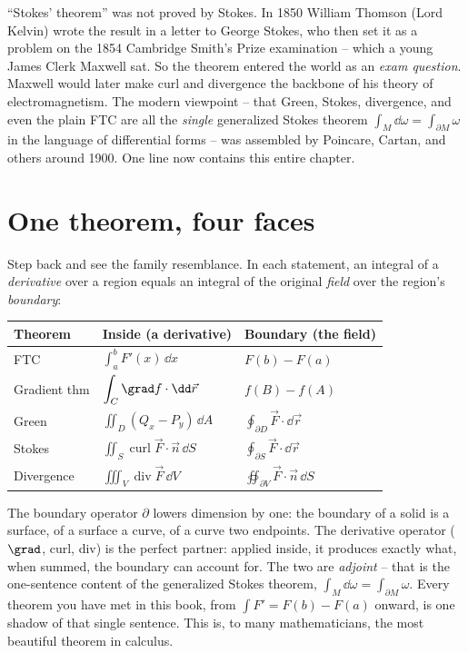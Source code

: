 \begin{historybox}
``Stokes' theorem'' was not proved by Stokes. In 1850 William Thomson (Lord Kelvin)
wrote the result in a letter to George Stokes, who then set it as a problem on the
1854 Cambridge Smith's Prize examination -- which a young James Clerk Maxwell sat.
So the theorem entered the world as an \emph{exam question}. Maxwell would later
make curl and divergence the backbone of his theory of electromagnetism. The modern
viewpoint -- that Green, Stokes, divergence, and even the plain FTC are all the
\emph{single} generalized Stokes theorem $\int_M \dd\omega = \int_{\partial M}\omega$
in the language of differential forms -- was assembled by Poincare, Cartan, and
others around 1900. One line now contains this entire chapter.
\end{historybox}

\section{One theorem, four faces}
\label{ch35:unification}

Step back and see the family resemblance. In each statement, an integral of a
\emph{derivative} over a region equals an integral of the original \emph{field}
over the region's \emph{boundary}:

\begin{center}
\renewcommand{\arraystretch}{1.6}
\begin{tabular}{@{}lll@{}}
\toprule
\textbf{Theorem} & \textbf{Inside (a derivative)} & \textbf{Boundary (the field)} \\
\midrule
FTC & $\displaystyle\int_a^b F'(x)\,\dd x$ & $F(b)-F(a)$ \\
Gradient thm & $\displaystyle\int_C \grad f\cdot\dd\vec r$ & $f(B)-f(A)$ \\
Green & $\displaystyle\iint_D (Q_x-P_y)\,\dd A$ & $\displaystyle\oint_{\partial D}\vec F\cdot\dd\vec r$ \\
Stokes & $\displaystyle\iint_S \operatorname{curl}\vec F\cdot\vec n\,\dd S$ & $\displaystyle\oint_{\partial S}\vec F\cdot\dd\vec r$ \\
Divergence & $\displaystyle\iiint_V \operatorname{div}\vec F\,\dd V$ & $\displaystyle\oiint_{\partial V}\vec F\cdot\vec n\,\dd S$ \\
\bottomrule
\end{tabular}
\end{center}

\begin{aestheticbox}
The boundary operator $\partial$ lowers dimension by one: the boundary of a solid is
a surface, of a surface a curve, of a curve two endpoints. The derivative operator
($\grad$, curl, div) is the perfect partner: applied inside, it produces exactly
what, when summed, the boundary can account for. The two are \emph{adjoint} -- that
is the one-sentence content of the generalized Stokes theorem,
$\int_M \dd\omega = \int_{\partial M}\omega$. Every theorem you have met in this
book, from $\int F' = F(b)-F(a)$ onward, is one shadow of that single sentence.
This is, to many mathematicians, the most beautiful theorem in calculus.
\end{aestheticbox}

